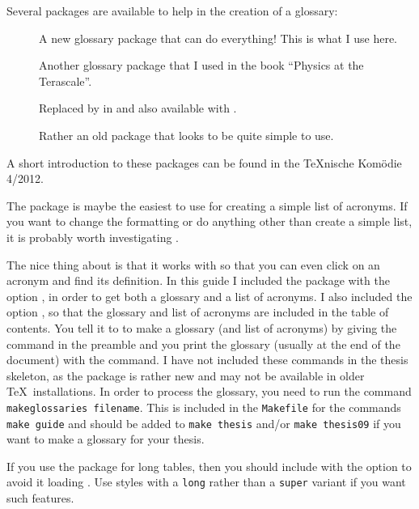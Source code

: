 Several packages are available to help in the creation of a glossary:
\begin{description}
\item[] A new glossary package that can do
  everything! This is what I use here.
\item[] Another glossary package that I used in the book
  \enquote{Physics at the Terascale}.
\item[] Replaced by  in
   and also available with .
\item[] Rather an old package that looks to be quite
  simple to use.
\end{description}

A short introduction to these packages can be found in the \TeX nische
Komödie 4/2012.

The  package is maybe the easiest to use for creating
a simple list of acronyms. If you want to change the formatting or do
anything other than create a simple list, it is probably worth
investigating .

The nice thing about  is that it works with
 so that you can even click on an acronym and find
its definition. In this guide I included the package with the option
, in order to get both a glossary and a list of
acronyms. I also included the option , so that the
glossary and list of acronyms are included in the table of
contents. You tell it to to make a glossary (and list of acronyms) by
giving the command  in the preamble and you
print the glossary (usually at the end of the document) with the
 command. I have not included these commands in
the thesis skeleton, as the  package is rather new
and may not be available in older \TeX\ installations. In order to
process the glossary, you need to run the command
\texttt{makeglossaries filename}. This is included in the
\texttt{Makefile} for the commands \texttt{make guide}
and should be added to \texttt{make thesis}
and/or \texttt{make thesis09} if you want to make a glossary for your
thesis.

If you use the package  for long tables,
then you should include  with the option 
to avoid it loading .
Use styles with a \texttt{long} rather than a \texttt{super} variant if you want such features.

